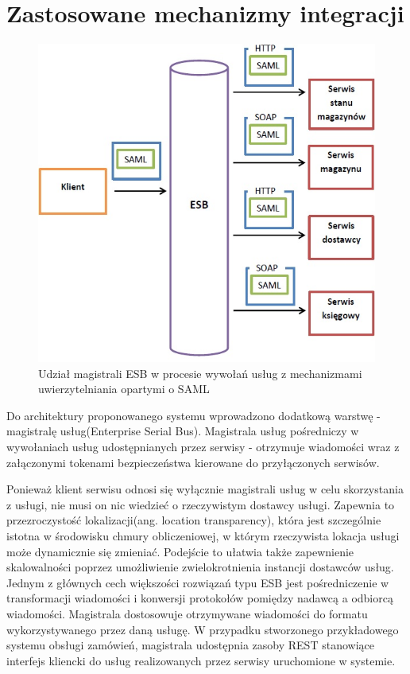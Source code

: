 \section{Zastosowane mechanizmy integracji}
\label{sec:integracja}

		\begin{figure}[h]
			\centering
			\includegraphics{img/esbAndSAML.jpg}
			\caption{Udział magistrali ESB w procesie wywołań usług z mechanizmami uwierzytelniania opartymi o SAML}
			\label{ESB i SAML}
		\end{figure}

		Do architektury proponowanego systemu wprowadzono dodatkową warstwę - magistralę usług(Enterprise Serial Bus). Magistrala usług pośredniczy w wywołaniach usług udostępnianych przez serwisy - otrzymuje wiadomości wraz z załączonymi tokenami bezpieczeństwa kierowane do przyłączonych serwisów. 
		
		Ponieważ klient serwisu odnosi się wyłącznie magistrali usług w celu skorzystania z usługi, nie musi on nic wiedzieć o rzeczywistym dostawcy usługi. Zapewnia to przezroczystość lokalizacji(ang. location transparency), która jest szczególnie istotna w środowisku chmury obliczeniowej, w którym rzeczywista lokacja usługi może dynamicznie się zmieniać. Podejście to ułatwia także zapewnienie skalowalności poprzez umożliwienie zwielokrotnienia instancji dostawców usług.
		Jednym z głównych cech większości rozwiązań typu ESB jest pośredniczenie w transformacji wiadomości i konwersji protokołów pomiędzy nadawcą a odbiorcą wiadomości. Magistrala dostosowuje otrzymywane wiadomości do formatu wykorzystywanego przez daną usługę. W przypadku stworzonego przykładowego systemu obsługi zamówień, magistrala udostępnia zasoby REST stanowiące interfejs kliencki do usług realizowanych przez serwisy uruchomione w systemie.
		
